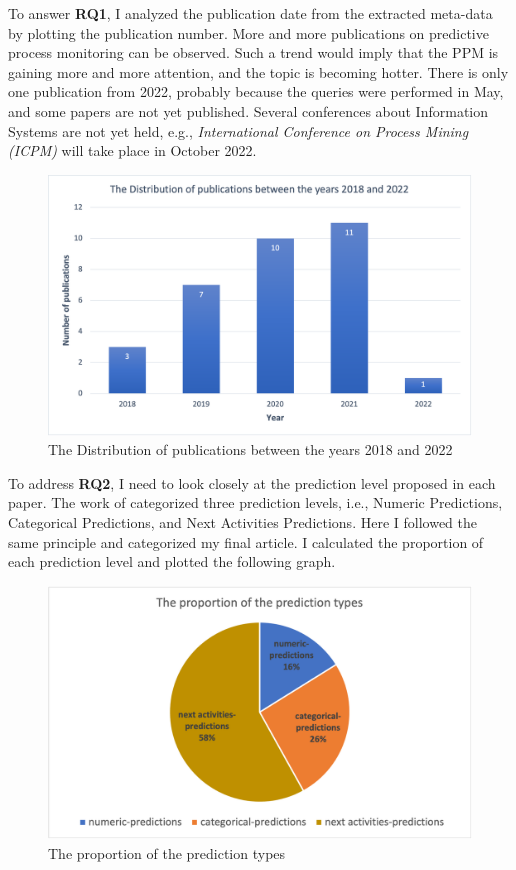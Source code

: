 \documentclass[runningheads]{llncs}
\begin{document}
		To answer \textbf{RQ1}, I analyzed the publication date from the extracted meta-data by plotting the publication number. More and more publications on predictive process monitoring can be observed. Such a trend would imply that the PPM is gaining more and more attention, and the topic is becoming hotter. There is only one publication from 2022, probably because the queries were performed in May, and some papers are not yet published. Several conferences about Information Systems are not yet held, e.g., \textit{International Conference on Process Mining (ICPM)} will take place in October 2022. 
	
	
		\begin{figure}
		\includegraphics[scale=0.4]{Distribution_publications.png}
		\centering
		\caption{The Distribution of publications between the years 2018 and 2022}
		\end{figure}
		
		To address \textbf{RQ2}, I need to look closely at the prediction level proposed in each paper. The work of \cite{original} categorized three prediction levels, i.e., Numeric Predictions,   Categorical Predictions, and Next Activities Predictions. Here I followed the same principle and categorized my final article. I calculated the proportion of each prediction level and plotted the following graph.
		
		
		\begin{figure}
		\includegraphics[scale=0.5]{proportion_prediction.png}
		\centering
		\caption{The proportion of the prediction types}
		\end{figure}
		
\end{document}

